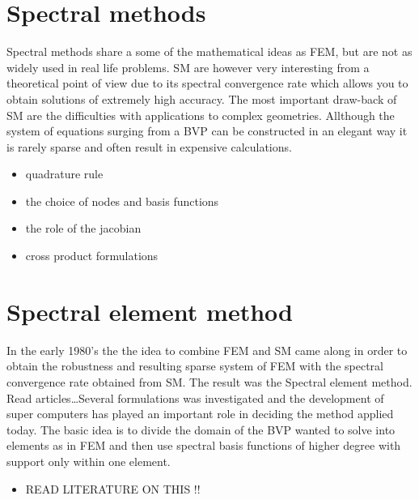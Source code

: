 \section{Spectral methods}
Spectral methods share a some of the mathematical ideas as FEM, but are not as widely used in real life problems. SM are however very 
interesting from a theoretical point of view due to its spectral convergence rate which allows you to obtain solutions of extremely high accuracy. 
The most important draw-back of SM are the difficulties with applications to complex geometries. Allthough the system of equations surging from
a BVP can be constructed in an elegant way it is rarely sparse and often result in expensive calculations. 

\begin{itemize}
\item quadrature rule
\item the choice of nodes and basis functions
\item the role of the jacobian 
\item cross product formulations
\end{itemize}

\cite{Canuto}


\section{Spectral element method}
In the early 1980's the the idea to combine FEM and SM came along in order to obtain the robustness and resulting sparse system of FEM with the
spectral convergence rate obtained from SM. The result was the Spectral element method. Read articles\ldots Several formulations was investigated  and the development of super computers has played an important role in deciding the method applied today. The basic idea is to divide the domain 
of the BVP wanted to solve into elements as in FEM and then use spectral basis functions of higher degree with support only within one element. 

\begin{itemize}
\item READ LITERATURE ON THIS !! 
\end{itemize}


